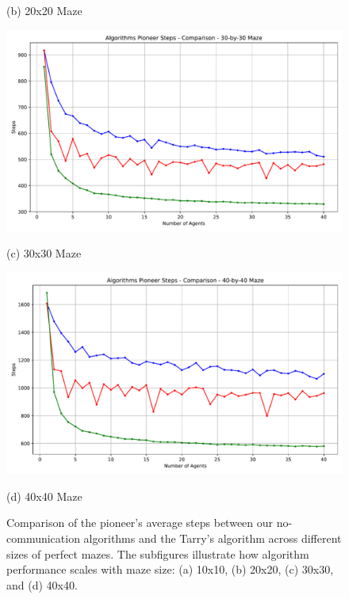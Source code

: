 \begin{figure}[H]
\begin{minipage}[b]{0.45\textwidth}
        \caption{(b) 20x20 Maze}
        \label{fig_no_comm_steps_20x20_maze}
    \end{minipage}
    \vspace{1em}
    \begin{minipage}[b]{0.45\textwidth}
        \centering
        \includegraphics[width=\textwidth]{Cap3/no_comm_steps__30_by_30_maze.pdf}
        \caption{(c) 30x30 Maze}
        \label{fig_no_comm_steps_30x30_maze}
    \end{minipage}
    \hfill
    \begin{minipage}[b]{0.45\textwidth}
        \centering
        \includegraphics[width=\textwidth]{Cap3/no_comm_steps__40_by_40_maze.pdf}
        \caption{(d) 40x40 Maze}
        \label{fig_no_comm_steps_40x40_maze}
    \end{minipage}
    \caption{Comparison of the pioneer's average steps between our no-communication algorithms and the Tarry's algorithm across different sizes of perfect mazes. The subfigures illustrate how algorithm performance scales with maze size: (a) 10x10, (b) 20x20, (c) 30x30, and (d) 40x40.}
    \label{fig_no_comm_steps_all_sizes_maze}
\end{figure}

